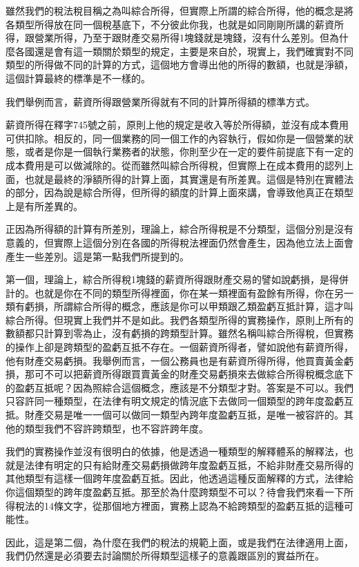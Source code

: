 \documentclass[oneside,sub3section]{ctexbook}
\begin{document}
雖然我們的稅法稅目稱之為叫綜合所得，但實際上所謂的綜合所得，他的概念是將各類型所得放在同一個稅基底下，不分彼此你我，也就是如同剛剛所講的薪資所得，跟營業所得，乃至于跟財產交易所得1塊錢就是塊錢，沒有什么差別。但為什麼各國還是會有這一類關於類型的規定，主要是來自於，現實上，我們確實對不同類型的所得做不同的計算的方式，這個地方會導出他的所得的數額，也就是淨額，這個計算最終的標準是不一樣的。

我們舉例而言，薪資所得跟營業所得就有不同的計算所得額的標準方式。

薪資所得在釋字745號之前，原則上他的規定是收入等於所得額，並沒有成本費用可供扣除。相反的，同一個業務的同一個工作的內容執行，假如你是一個營業的狀態，或者是你是一個執行業務者的狀態，你則至少在一定的要件前提底下有一定的成本費用是可以做減除的。從而雖然叫綜合所得稅，但實際上在成本費用的認列上面，也就是最終的淨額所得的計算上面，其實還是有所差異。這個是特別在實體法的部分，因為說是綜合所得，但所得的額度的計算上面來講，會導致他真正在類型上是有所差異的。

正因為所得額的計算有所差別，理論上，綜合所得稅是不分類型，這個分別是沒有意義的，但實際上這個分別在各國的所得稅法裡面仍然會產生，因為他立法上面會產生一些差別。這是第一點我們所提到的。

第一個，理論上，綜合所得稅1塊錢的薪資所得跟財產交易的譬如說虧損，是得併計的。也就是你在不同的類型所得裡面，你在某一類裡面有盈餘有所得，你在另一類有虧損，所謂綜合所得的概念，應該是你可以甲類跟乙類盈虧互抵計算，這才叫綜合所得。但現實上我們并不是如此。我們各類型所得的實務操作，原則上所有的數額都只計算到零為止，沒有虧損的跨類型計算。雖然名稱叫綜合所得稅，但實務的操作上卻是跨類型的盈虧互抵不存在。一個薪資所得者，譬如說他有薪資所得，他有財產交易虧損。我舉例而言，一個公務員也是有薪資所得所得，他買賣黃金虧損，那可不可以把薪資所得跟買賣黃金的財產交易虧損來去做綜合所得稅概念底下的盈虧互抵呢？因為照綜合這個概念，應該是不分類型才對。答案是不可以。我們只容許同一種類型，在法律有明文規定的情況底下去做同一個類型的跨年度盈虧互抵。財產交易是唯一一個可以做同一類型內跨年度盈虧互抵，是唯一被容許的。其他的類型我們不容許跨類型，也不容許跨年度。

我們的實務操作並沒有很明白的依據，他是透過一種類型的解釋體系的解釋法，也就是法律有明定的只有給財產交易虧損做跨年度盈虧互抵，不給非財產交易所得的其他類型有這樣一個跨年度盈虧互抵。因此，他透過這種反面解釋的方式，法律給你這個類型的跨年度盈虧互抵。那至於為什麼跨類型不可以？待會我們來看一下所得稅法的14條文字，從那個地方裡面，實務上認為不給跨類型的盈虧互抵的這種可能性。

因此，這是第二個，為什麼在我們的稅法的規範上面，或是我們在法律適用上面，我們仍然還是必須要去討論關於所得類型這樣子的意義跟區別的實益所在。
\end{document}
